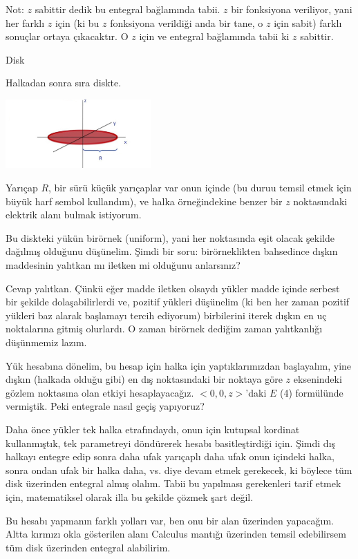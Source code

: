 \documentclass[12pt,fleqn]{article}\usepackage{../../common}
\begin{document}
Not: $z$ sabittir dedik bu entegral bağlamında tabii. $z$ bir fonksiyona
veriliyor, yani her farklı $z$ için (ki bu $z$ fonksiyona verildiği anda bir
tane, o $z$ için sabit) farklı sonuçlar ortaya çıkacaktır. O $z$ için ve
entegral bağlamında tabii ki $z$ sabittir.

Disk

Halkadan sonra sıra diskte.

\includegraphics[width=15em]{06_08.jpg}

Yarıçap $R$, bir sürü küçük yarıçaplar var onun içinde (bu duruu temsil etmek
için büyük harf sembol kullandım), ve halka örneğindekine benzer bir $z$
noktasındaki elektrik alanı bulmak istiyorum. 

Bu diskteki yükün birörnek (uniform), yani her noktasında eşit olacak şekilde
dağılmış olduğunu düşünelim. Şimdi bir soru: birörneklikten bahsedince dışkın
maddesinin yalıtkan mı iletken mi olduğunu anlarsınız?

Cevap yalıtkan. Çünkü eğer madde iletken olsaydı yükler madde içinde serbest bir
şekilde dolaşabilirlerdi ve, pozitif yükleri düşünelim (ki ben her zaman pozitif
yükleri baz alarak başlamayı tercih ediyorum) birbilerini iterek dışkın en uç
noktalarına gitmiş olurlardı. O zaman birörnek dediğim zaman yalıtkanlığı
düşünmemiz lazım.

Yük hesabına dönelim, bu hesap için halka için yaptıklarımızdan başlayalım, yine
dışkın (halkada olduğu gibi) en dış noktasındaki bir noktaya göre $z$
eksenindeki gözlem noktasına olan etkiyi hesaplayacağız. $<0,0,z>$'daki $E$ (4)
formülünde vermiştik. Peki entegrale nasıl geçiş yapıyoruz?

Daha önce yükler tek halka etrafındaydı, onun için kutupsal kordinat
kullanmıştık, tek parametreyi döndürerek hesabı basitleştirdiği için. Şimdi dış
halkayı entegre edip sonra daha ufak yarıçaplı daha ufak onun içindeki halka,
sonra ondan ufak bir halka daha, vs. diye devam etmek gerekecek, ki böylece tüm
disk üzerinden entegral almış olalım. Tabii bu yapılması gerekenleri tarif etmek
için, matematiksel olarak illa bu şekilde çözmek şart değil. 

Bu hesabı yapmanın farklı yolları var, ben onu bir alan üzerinden
yapacağım. Altta kırmızı okla gösterilen alanı Calculus mantığı üzerinden temsil
edebilirsem tüm disk üzerinden entegral alabilirim.
\end{document}
